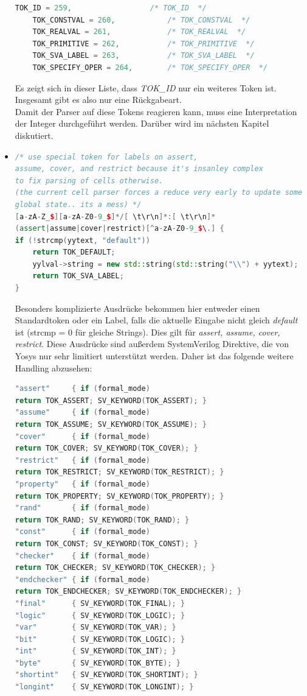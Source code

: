 \documentclass[11pt]{report}
\begin{document}
\begin{itemize}
\begin{lstlisting}[language=C++]
    TOK_ID = 259,                  /* TOK_ID  */
    TOK_CONSTVAL = 260,            /* TOK_CONSTVAL  */
    TOK_REALVAL = 261,             /* TOK_REALVAL  */
    TOK_PRIMITIVE = 262,           /* TOK_PRIMITIVE  */
    TOK_SVA_LABEL = 263,           /* TOK_SVA_LABEL  */
    TOK_SPECIFY_OPER = 264,        /* TOK_SPECIFY_OPER  */
\end{lstlisting}
Es zeigt sich in dieser Liste, dass \textit{TOK\_ID} nur ein weiteres Token ist. Insgesamt gibt es also nur eine Rückgabeart.\\
Damit der Parser auf diese Tokens reagieren kann, muss eine Interpretation der Integer durchgeführt werden. Darüber wird im nächsten Kapitel diskutiert.
\item 
\begin{lstlisting}[language=C++]
/* use special token for labels on assert,
assume, cover, and restrict because it's insanley complex
to fix parsing of cells otherwise.
(the current cell parser forces a reduce very early to update some
global state.. its a mess) */
[a-zA-Z_$][a-zA-Z0-9_$]*/[ \t\r\n]*:[ \t\r\n]*
(assert|assume|cover|restrict)[^a-zA-Z0-9_$\.] {
if (!strcmp(yytext, "default"))
	return TOK_DEFAULT;
	yylval->string = new std::string(std::string("\\") + yytext);
	return TOK_SVA_LABEL;
}
\end{lstlisting}

Besonders komplizierte Ausdrücke bekommen hier entweder einen Standardtoken oder ein Label, falls die aktuelle Eingabe nicht gleich \textit{default} ist (strcmp = 0 für gleiche Strings). Dies gilt für \textit{assert, assume, cover, restrict}. Diese Ausdrücke sind außerdem SystemVerilog Direktive, die von Yosys nur sehr limitiert unterstützt werden. Daher ist das folgende weitere Handling abzusehen:
\begin{lstlisting}[language=C++]
"assert"     { if (formal_mode) 
return TOK_ASSERT; SV_KEYWORD(TOK_ASSERT); }
"assume"     { if (formal_mode) 
return TOK_ASSUME; SV_KEYWORD(TOK_ASSUME); }
"cover"      { if (formal_mode) 
return TOK_COVER; SV_KEYWORD(TOK_COVER); }
"restrict"   { if (formal_mode) 
return TOK_RESTRICT; SV_KEYWORD(TOK_RESTRICT); }
"property"   { if (formal_mode) 
return TOK_PROPERTY; SV_KEYWORD(TOK_PROPERTY); }
"rand"       { if (formal_mode) 
return TOK_RAND; SV_KEYWORD(TOK_RAND); }
"const"      { if (formal_mode) 
return TOK_CONST; SV_KEYWORD(TOK_CONST); }
"checker"    { if (formal_mode) 
return TOK_CHECKER; SV_KEYWORD(TOK_CHECKER); }
"endchecker" { if (formal_mode) 
return TOK_ENDCHECKER; SV_KEYWORD(TOK_ENDCHECKER); }
"final"      { SV_KEYWORD(TOK_FINAL); }
"logic"      { SV_KEYWORD(TOK_LOGIC); }
"var"        { SV_KEYWORD(TOK_VAR); }
"bit"        { SV_KEYWORD(TOK_LOGIC); }
"int"        { SV_KEYWORD(TOK_INT); }
"byte"       { SV_KEYWORD(TOK_BYTE); }
"shortint"   { SV_KEYWORD(TOK_SHORTINT); }
"longint"    { SV_KEYWORD(TOK_LONGINT); }


\end{lstlisting}
\end{itemize}
\end{document}
